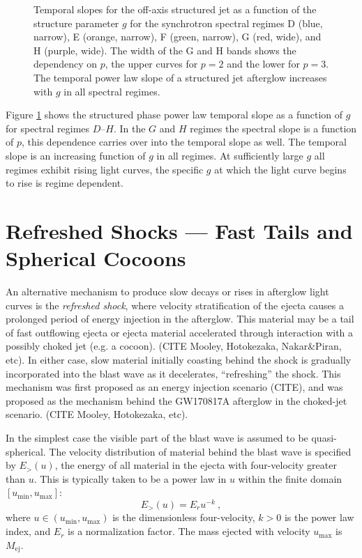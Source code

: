 \documentclass[twocolumn]{aastex62}
\newcommand{\gwbns}{GW170817A}
\newcommand{\Mej}{\ensuremath{M_{\mathrm{ej}}}}
\newcommand{\umin}{\ensuremath{u_{\mathrm{min}}}}
\newcommand{\umax}{\ensuremath{u_{\mathrm{max}}}}
\begin{document}
\begin{figure}
	\caption{Temporal slopes for the off-axis structured jet as a function of the structure parameter $g$ for the synchrotron spectral regimes D (blue, narrow), E (orange, narrow),  F (green, narrow), G (red, wide), and H (purple, wide).  The width of the G and H bands shows the dependency on $p$, the upper curves for $p=2$ and the lower for $p=3$.  The temporal power law slope of a structured jet afterglow increases with $g$ in all spectral regimes. \label{fig:slopesG}}
\end{figure}

Figure \ref{fig:slopesG} shows the structured phase power law temporal slope as a function of $g$ for spectral regimes $D$--$H$. In the $G$ and $H$ regimes the spectral slope is a function of $p$, this dependence carries over into the temporal slope as well. The temporal slope is an increasing function of $g$ in all regimes.  At sufficiently large $g$ all regimes exhibit rising light curves, the specific $g$ at which the light curve begins to rise is regime dependent.

\section{Refreshed Shocks --- Fast Tails and Spherical Cocoons}\label{sec:refreshedShocks}

An alternative mechanism to produce slow decays or rises in afterglow light curves is the \emph{refreshed shock}, where velocity stratification of the ejecta causes a prolonged period of energy injection in the afterglow.  This material may be a tail of fast outflowing ejecta or ejecta material accelerated through interaction with a possibly choked jet (e.g. a cocoon). (CITE Mooley, Hotokezaka, Nakar\&Piran, etc).  In either case, slow material initially coasting behind the shock is gradually incorporated into the blast wave as it decelerates, ``refreshing'' the shock.  This mechanism was first proposed as an energy injection scenario (CITE), and was proposed as the mechanism behind the \gwbns{} afterglow in the choked-jet scenario. (CITE Mooley, Hotokezaka, etc).

In the simplest case the visible part of the blast wave is assumed to be quasi-spherical.  The velocity distribution of material behind the blast wave is specified by $E_{>}(u)$, the energy of all material in the ejecta with four-velocity greater than $u$.  This is typically taken to be a power law in $u$ within the finite domain $[\umin, \umax]$:
\begin{equation}
	E_>(u) = E_r u^{-k}\ , \label{eq:Eu}
\end{equation}
where $u \in (\umin, \umax)$ is the dimensionless four-velocity, $k>0$ is the power law index, and $E_r$ is a normalization factor.  The mass ejected with velocity $\umax$ is $\Mej$.
\end{document}
